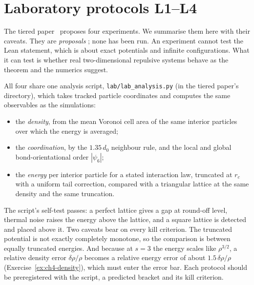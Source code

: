 \section{Laboratory protocols L1--L4}\label{sec:ch4-lab}

The tiered paper~\cite{tiered} proposes four experiments. We summarise them here with their caveats. They are
\emph{proposals} \tierC; none has been run. An experiment cannot test the Lean statement, which is about exact
potentials and infinite configurations. What it can test is whether real two-dimensional repulsive systems behave as
the theorem and the numerics suggest.

All four share one analysis script, \texttt{lab/lab\_analysis.py} (in the tiered paper's directory), which takes
tracked particle coordinates and computes the same observables as the simulations:
\begin{itemize}
\item the \emph{density}, from the mean Voronoi cell area of the same interior particles over which the energy is
averaged;
\item the \emph{coordination}, by the $1.35\,d_0$ neighbour rule, and the local and global bond-orientational order
$|\psi_6|$;
\item the \emph{energy} per interior particle for a stated interaction law, truncated at $r_c$ with a uniform tail
correction, compared with a triangular lattice at the same density and the same truncation.
\end{itemize}
The script's self-test passes: a perfect lattice gives a gap at round-off level, thermal noise raises the energy
above the lattice, and a square lattice is detected and placed above it. Two caveats bear on every kill criterion.
The truncated potential is not exactly completely monotone, so the comparison is between equally truncated
energies. And because at $s=3$ the energy scales like $\rho^{3/2}$, a relative density error $\delta\rho/\rho$
becomes a relative energy error of about $1.5\,\delta\rho/\rho$ (Exercise~\ref{ex:ch4-density}), which must enter
the error bar. Each protocol should be preregistered with the script, a predicted bracket and its kill criterion.

